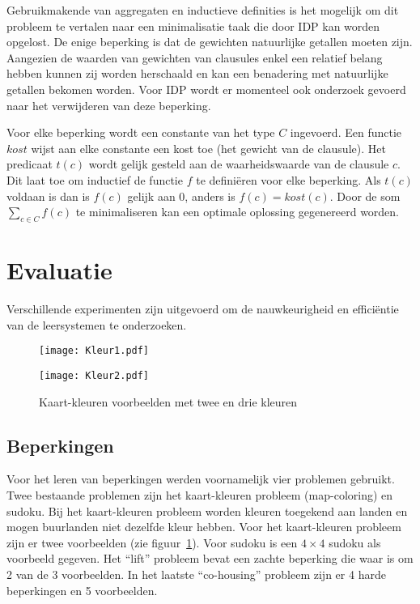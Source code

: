 Gebruikmakende van aggregaten en inductieve definities is het mogelijk om dit probleem te vertalen naar een minimalisatie taak die door IDP kan worden opgelost.
De enige beperking is dat de gewichten natuurlijke getallen moeten zijn.
Aangezien de waarden van gewichten van clausules enkel een relatief belang hebben kunnen zij worden herschaald en kan een benadering met natuurlijke getallen bekomen worden.
Voor IDP wordt er momenteel ook onderzoek gevoerd naar het verwijderen van deze beperking.

Voor elke beperking wordt een constante van het type $C$ ingevoerd.
Een functie $\mathit{kost}$ wijst aan elke constante een kost toe (het gewicht van de clausule).
Het predicaat $t(c)$ wordt gelijk gesteld aan de waarheidswaarde van de clausule $c$.
Dit laat toe om inductief de functie $f$ te defini\"eren voor elke beperking.
Als $t(c)$ voldaan is dan is $f(c)$ gelijk aan 0, anders is $f(c) = \mathit{kost}(c)$.
Door de som $\sum_{c \in C} f(c)$ te minimaliseren kan een optimale oplossing gegenereerd worden.

\section{Evaluatie}
Verschillende experimenten zijn uitgevoerd om de nauwkeurigheid en effici\"entie van de leersystemen te onderzoeken.

\begin{figure}
  \centering
  \begin{minipage}{.49\linewidth}
    \centering
    \texttt{[image: Kleur1.pdf]}
  \end{minipage}
  \begin{minipage}{.49\linewidth}
    \centering
    \texttt{[image: Kleur2.pdf]}
  \end{minipage}
  \caption{Kaart-kleuren voorbeelden met twee en drie kleuren}
  \label{fig:map_color}
\end{figure}

\subsection{Beperkingen}
Voor het leren van beperkingen werden voornamelijk vier problemen gebruikt.
Twee bestaande problemen zijn het kaart-kleuren probleem (map-coloring) en sudoku.
Bij het kaart-kleuren probleem worden kleuren toegekend aan landen en mogen buurlanden niet dezelfde kleur hebben.
Voor het kaart-kleuren probleem zijn er twee voorbeelden (zie figuur~\ref{fig:map_color}).
Voor sudoku is een $4 \times 4$ sudoku als voorbeeld gegeven.
Het ``lift'' probleem bevat een zachte beperking die waar is om 2 van de 3 voorbeelden.
In het laatste ``co-housing'' probleem zijn er 4 harde beperkingen en 5 voorbeelden.

